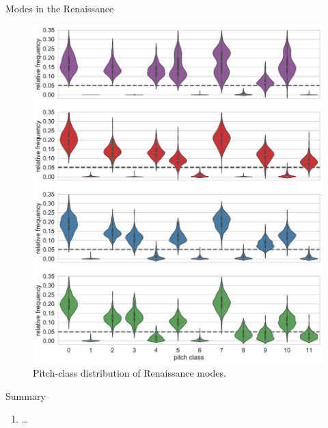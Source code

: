 \begin{frame}{Modes in the Renaissance}
    \begin{figure}
        \includegraphics[width=\linewidth,height=.8\textheight,keepaspectratio]{img/Figure7.pdf}
        \caption{Pitch-class distribution of Renaissance modes.}
    \end{figure}
\end{frame}

\begin{frame}{Summary}
    \begin{enumerate}
        \item \ldots
    \end{enumerate}
\end{frame}